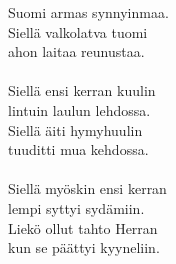
            Suomi armas synnyinmaa. \\
            Siellä valkolatva tuomi \\
            ahon laitaa reunustaa. \\
\hspace{10mm} \\
            Siellä ensi kerran kuulin \\
            lintuin laulun lehdossa. \\
            Siellä äiti hymyhuulin \\
            tuuditti mua kehdossa. \\
\hspace{10mm} \\
            Siellä myöskin ensi kerran \\
            lempi syttyi sydämiin. \\
            Liekö ollut tahto Herran \\
            kun se päättyi kyyneliin. \\
